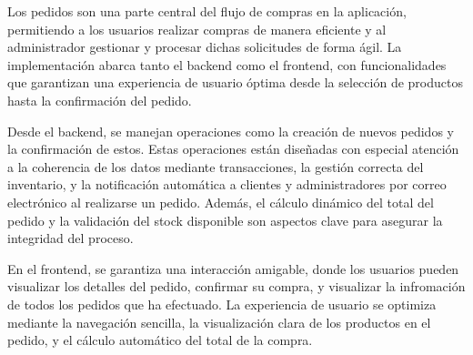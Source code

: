 Los pedidos son una parte central del flujo de compras en la aplicación, permitiendo a los usuarios realizar compras de manera eficiente y al administrador gestionar y procesar dichas solicitudes de forma ágil. La implementación abarca tanto el backend como el frontend, con funcionalidades que garantizan una experiencia de usuario óptima desde la selección de productos hasta la confirmación del pedido.

\vspace{0.5cm}

Desde el backend, se manejan operaciones como la creación de nuevos pedidos y la confirmación de estos. Estas operaciones están diseñadas con especial atención a la coherencia de los datos mediante transacciones, la gestión correcta del inventario, y la notificación automática a clientes y administradores por correo electrónico al realizarse un pedido. Además, el cálculo dinámico del total del pedido y la validación del stock disponible son aspectos clave para asegurar la integridad del proceso.

\vspace{0.5cm}

En el frontend, se garantiza una interacción amigable, donde los usuarios pueden visualizar los detalles del pedido, confirmar su compra, y visualizar la infromación de todos los pedidos que ha efectuado. La experiencia de usuario se optimiza mediante la navegación sencilla, la visualización clara de los productos en el pedido, y el cálculo automático del total de la compra.


